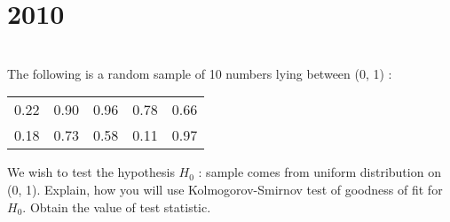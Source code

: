 \section*{2010}
\vspace{-.5cm}
\hrulefill \smallskip\\
 The following is a random sample of 10 numbers lying between (0, 1) :
\begin{center}
    \begin{tabular}{*{5}{c}}
         0.22 & 0.90 & 0.96 & 0.78 & 0.66  \\
         0.18 & 0.73 & 0.58 & 0.11 & 0.97 
    \end{tabular}
\end{center}
We wish to test the hypothesis $H_0$ : sample comes from uniform distribution on (0, 1). Explain, how you will use Kolmogorov-Smirnov test of goodness of fit for $H_0$. Obtain the value of test statistic.